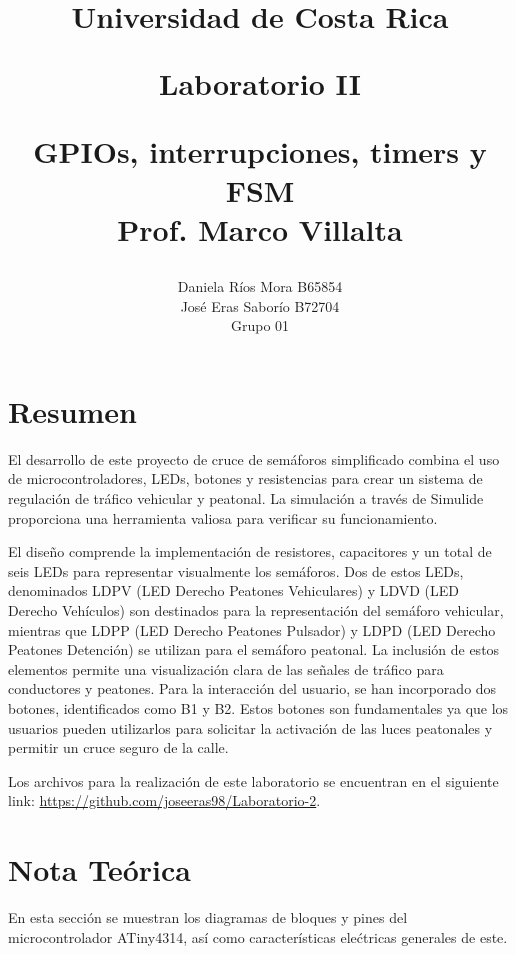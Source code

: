 \documentclass[12pt,letterpaper]{article}     %
\author{Daniela Ríos Mora B65854\\ José Eras Saborío B72704\\  {\small Grupo 01 \bigskip \bigskip}}
\title{{ \begin{Huge}Universidad de Costa Rica \\\bigskip \bigskip \bigskip \bigskip \bigskip \bigskip \end{Huge}  Laboratorio II\\\bigskip \bigskip \bigskip \bigskip \bigskip \bigskip }    
GPIOs, interrupciones, timers y FSM\\\bigskip \bigskip \bigskip \bigskip \bigskip \bigskip \bigskip  Prof. Marco Villalta \bigskip \bigskip \bigskip \bigskip \bigskip}
\begin{document}



\maketitle							%
\thispagestyle{empty}
\newpage


\tableofcontents
\thispagestyle{empty}
\newpage

\setcounter{page}{1}
%



\section{Resumen}
El desarrollo de este proyecto de cruce de semáforos simplificado combina el uso de microcontroladores, LEDs, botones y resistencias para crear un sistema de regulación de tráfico vehicular y peatonal. La simulación a través de Simulide proporciona una herramienta valiosa para verificar su funcionamiento.

El diseño comprende la implementación de resistores, capacitores y un total de seis LEDs para representar visualmente los semáforos. Dos de estos LEDs, denominados LDPV (LED Derecho Peatones Vehiculares) y LDVD (LED Derecho Vehículos) son destinados para la representación del semáforo vehicular, mientras que LDPP (LED Derecho Peatones Pulsador) y LDPD (LED Derecho Peatones Detención) se utilizan para el semáforo peatonal. La inclusión de estos elementos permite una visualización clara de las señales de tráfico para conductores y peatones. Para la interacción del usuario, se han incorporado dos botones, identificados como B1 y B2. Estos botones son fundamentales ya que los usuarios pueden utilizarlos para solicitar la activación de las luces peatonales y permitir un cruce seguro de la calle.

Los archivos para la realizaci\'on de este laboratorio se encuentran en el siguiente link:
\url{https://github.com/joseeras98/Laboratorio-2}. 


\section{Nota Te\'orica}
En esta secci\'on se muestran los diagramas de bloques y pines del microcontrolador ATiny4314, as\'i como caracter\'isticas ele\'ctricas generales de este. 
\end{document}
